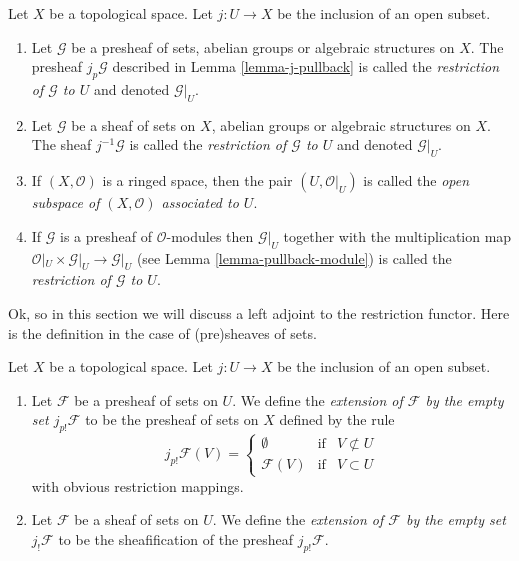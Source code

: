 \begin{definition}
\label{definition-restriction}
Let $X$ be a topological space.
Let $j : U \to X$ be the inclusion of an open subset.
\begin{enumerate}
\item Let $\mathcal{G}$ be a presheaf of sets, abelian groups or
algebraic structures on $X$. The presheaf $j_p\mathcal{G}$ described
in Lemma \ref{lemma-j-pullback} is called
the {\it restriction of $\mathcal{G}$ to $U$} and denoted $\mathcal{G}|_U$.
\item Let $\mathcal{G}$ be a sheaf of sets on $X$, abelian groups or
algebraic structures on $X$. The sheaf $j^{-1}\mathcal{G}$ is called
the {\it restriction of $\mathcal{G}$ to $U$} and denoted $\mathcal{G}|_U$.
\item If $(X, \mathcal{O})$ is a ringed space, then the pair
$(U, \mathcal{O}|_U)$ is called the
{\it open subspace of $(X, \mathcal{O})$ associated to $U$}.
\item If $\mathcal{G}$ is a presheaf of $\mathcal{O}$-modules
then $\mathcal{G}|_U$ together with the multiplication map
$\mathcal{O}|_U \times \mathcal{G}|_U \to \mathcal{G}|_U$
(see Lemma \ref{lemma-pullback-module})
is called the {\it restriction of $\mathcal{G}$ to $U$}.
\end{enumerate}
\end{definition}

\noindent
Ok, so in this section we will
discuss a left adjoint to the restriction functor.
Here is the definition in the case of (pre)sheaves
of sets.

\begin{definition}
\label{definition-j-shriek}
Let $X$ be a topological space.
Let $j : U \to X$ be the inclusion of an open subset.
\begin{enumerate}
\item Let $\mathcal{F}$ be a presheaf of sets on $U$. We define
the {\it extension of $\mathcal{F}$ by the empty set $j_{p!}\mathcal{F}$}
to be the presheaf of sets on $X$ defined by the rule
$$
j_{p!}\mathcal{F}(V) =
\left\{
\begin{matrix}
\emptyset & \text{if} & V \not \subset U \\
\mathcal{F}(V) & \text{if} & V \subset U
\end{matrix}
\right.
$$
with obvious restriction mappings.
\item Let $\mathcal{F}$ be a sheaf of sets on $U$. We define
the {\it extension of $\mathcal{F}$ by the empty set $j_!\mathcal{F}$}
to be the sheafification of the presheaf $j_{p!}\mathcal{F}$.
\end{enumerate}
\end{definition}

